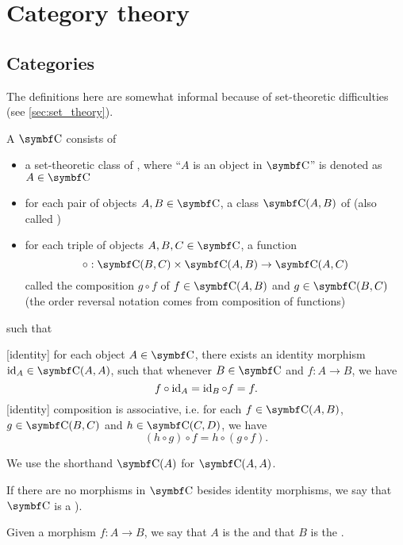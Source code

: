 \section{Category theory}\label{sec:category_theory}
\subsection{Categories}\label{subsec:categories}

\begin{remark}
  The definitions here are somewhat informal because of set-theoretic difficulties (see \cref{sec:set_theory}).
\end{remark}

\begin{definition}\label{def:category}\cite[definition 1.1.1]{Leinster2014}
  A  \( \Bold C \) consists of
  \begin{itemize}
    \item a set-theoretic class of , where \enquote{\( A \) is an object in \( \Bold C \)} is denoted as \( A \in \Bold C \)
    \item for each pair of objects \( A, B \in \Bold C \), a class \( {\Bold C}(A, B) \) of  (also called )
    \item for each triple of objects \( A, B, C \in \Bold C \), a function
    \begin{equation*}
      \circ: {\Bold C}(B, C) \times {\Bold C}(A, B) \to {\Bold C}(A, C)
    \end{equation*}
    called the composition \( g \circ f \) of \( f \in {\Bold C}(A, B) \) and \( g \in {\Bold C}(B, C) \) (the order reversal notation comes from composition of functions)
  \end{itemize}
  such that
  \begin{description}
    [identity] for each object \( A \in \Cat{C} \), there exists an identity morphism \( \Id_A \in \Cat{C}(A, A) \), such that whenever \( B \in \Cat{C} \) and \( f: A \to B \), we have
    \begin{equation*}
      f \circ \operatorname{id}_A = \operatorname{id}_B \circ f = f.
    \end{equation*}
    [identity] composition is associative, i.e. for each \( f \in {\Bold C}(A, B) \), \( g \in {\Bold C}(B, C) \) and \( h \in {\Bold C}(C, D) \), we have
    \begin{equation*}
      (h \circ g) \circ f = h \circ (g \circ f).
    \end{equation*}
  \end{description}

  We use the shorthand \( \Cat{C}(A) \) for \( \Cat{C}(A, A) \).

  If there are no morphisms in \( \Bold C \) besides identity morphisms, we say that \( \Bold C \) is a  \cite[example 1.1.18(b]{Leinster2014}).

  Given a morphism \( f: A \to B \), we say that \( A \) is the  and that \( B \) is the .
\end{definition}

